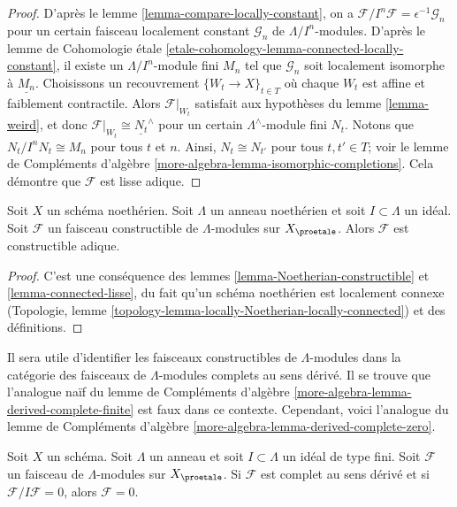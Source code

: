 \begin{proof}
D'après le lemme \ref{lemma-compare-locally-constant}, on a
$\mathcal{F}/I^n\mathcal{F} = \epsilon^{-1}\mathcal{G}_n$
pour un certain faisceau localement constant $\mathcal{G}_n$ de $\Lambda/I^n$-modules. D'après
le lemme de Cohomologie \'etale
\ref{etale-cohomology-lemma-connected-locally-constant},
il existe un $\Lambda/I^n$-module fini $M_n$ tel que
$\mathcal{G}_n$ soit localement isomorphe à $\underline{M_n}$.
Choisissons un recouvrement $\{W_t \to X\}_{t \in T}$ où chaque $W_t$ est
affine et faiblement contractile.
Alors $\mathcal{F}|_{W_t}$ satisfait aux hypothèses du
lemme \ref{lemma-weird},
et donc $\mathcal{F}|_{W_t} \cong \underline{N_t}^\wedge$
pour un certain $\Lambda^\wedge$-module fini $N_t$. Notons que
$N_t/I^nN_t \cong M_n$ pour tous $t$ et $n$. Ainsi,
$N_t \cong N_{t'}$ pour tous $t, t' \in T$; voir le
lemme de Compléments d'algèbre \ref{more-algebra-lemma-isomorphic-completions}.
Cela démontre que $\mathcal{F}$ est lisse adique.
\end{proof}

\begin{lemma}
\label{lemma-Noetherian-adic-constructible}
Soit $X$ un schéma noethérien. Soit $\Lambda$ un anneau noethérien et
soit $I \subset \Lambda$ un idéal. Soit $\mathcal{F}$ un
faisceau constructible de $\Lambda$-modules sur $X_\proetale$. Alors $\mathcal{F}$
est constructible adique.
\end{lemma}

\begin{proof}
C'est une conséquence des lemmes \ref{lemma-Noetherian-constructible} et
\ref{lemma-connected-lisse}, du fait qu'un schéma noethérien
est localement connexe
(Topologie, lemme \ref{topology-lemma-locally-Noetherian-locally-connected})
et des définitions.
\end{proof}

\noindent
Il sera utile d'identifier les faisceaux constructibles de $\Lambda$-modules
dans la catégorie des faisceaux de $\Lambda$-modules complets au sens dérivé.
Il se trouve que l'analogue naïf du
lemme de Compléments d'algèbre \ref{more-algebra-lemma-derived-complete-finite}
est faux dans ce contexte. Cependant, voici
l'analogue du lemme de Compléments d'algèbre
\ref{more-algebra-lemma-derived-complete-zero}.

\begin{lemma}
\label{lemma-derived-complete-zero}
Soit $X$ un schéma. Soit $\Lambda$ un anneau et soit
$I \subset \Lambda$ un idéal de type fini.
Soit $\mathcal{F}$ un faisceau de $\Lambda$-modules sur $X_\proetale$.
Si $\mathcal{F}$ est complet au sens dérivé et si $\mathcal{F}/I\mathcal{F} = 0$,
alors $\mathcal{F} = 0$.
\end{lemma}

